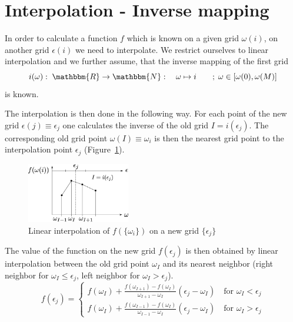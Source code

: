 \section{Interpolation - Inverse mapping}
In order to calculate a function $f$ which is known on a given grid $\omega(i)$, on another grid $\epsilon(i)$ we need to interpolate. We restrict ourselves to linear interpolation and we further assume, that the inverse mapping of the first grid
\[
	i(\omega):\;\mathbbm{R}\to\mathbbm{N}:\quad \omega \mapsto i\quad\quad;\;\omega\in[\omega(0), \omega(M)]
\]
is known.

The interpolation is then done in the following way. For each point of the new grid $\epsilon(j)\equiv \epsilon_j$ one calculates the inverse of the old grid $I=i(\epsilon_j)$. The corresponding old grid point $\omega(I)\equiv \omega_i$ is then the nearest grid point to the interpolation point $\epsilon_j$ (Figure~\ref{fig:interpolation}). 
\begin{figure}[ht]
	\centering
	\includegraphics[width=0.4\textwidth]{pics/interpolation.eps}
	\caption{Linear interpolation of $f(\{\omega_i\})$ on a new grid $\{ \epsilon_j \}$}
	\label{fig:interpolation}
\end{figure}

The value of the function on the new grid $f(\epsilon_j)$ is then obtained by linear interpolation between the old grid point $\omega_I$ and its nearest neighbor (right neighbor for $\omega_I\leq\epsilon_j$, left neighbor for $\omega_I>\epsilon_j$).
\[
	f(\epsilon_j)=\begin{cases}
		f(\omega_I)+\frac{f(\omega_{I+1})-f(\omega_{I})}{\omega_{I+1}-\omega_{I}} (\epsilon_j-\omega_I) \quad \text{for } \omega_I<\epsilon_j \\
		f(\omega_I)+\frac{f(\omega_{I-1})-f(\omega_{I})}{\omega_{I-1}-\omega_{I}} (\epsilon_j-\omega_I) \quad \text{for } \omega_I>\epsilon_j 
	\end{cases}
\]






